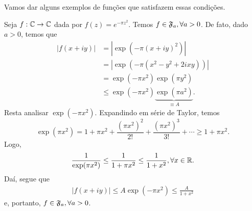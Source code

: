         Vamos dar alguns exemplos de funções que satisfazem essas condições.
        \begin{exemplo}
            Seja $f:\mathbb{C}\to\mathbb{C}$ dada por $f(z) = e^{-\pi z^2}$. Temos $f\in\mathfrak{F}_a, \forall a>0$.
            De fato, dado $a>0$, temos que
            \begin{align*}
                |f(x+iy)| &= |\exp(-\pi(x+iy)^2)| \\
                          &= |\exp(-\pi(x^2-y^2+2ixy))| \\
                          &= \exp(-\pi x^2)\exp(\pi y^2) \\
                          &\leq \exp(-\pi x^2)\underbrace{\exp(\pi a^2)}_{\equiv A}.
            \end{align*}
            Resta analisar $\exp(-\pi x^2)$. Expandindo em série de Taylor, temos
            \begin{equation*}
                \exp(\pi x^2) = 1 + \pi x^2 + \frac{(\pi x^2)^2}{2!} + \frac{(\pi x^2)^3}{3!} + \cdots
                              \geq 1 + \pi x^2.
            \end{equation*}
            Logo,
            \begin{equation*}
                \frac{1}{\exp(\pi x^2)}\leq\frac{1}{1+\pi x^2}\leq\frac{1}{1+x^2},\forall x\in\mathbb{R}.
            \end{equation*}
            Daí, segue que
            \begin{align*}
                |f(x+iy)| \leq A\exp(-\pi x^2) \leq \frac{A}{1+x^2}
            \end{align*}
            e, portanto, $f\in\mathfrak{F}_a, \forall a>0$.
        \end{exemplo}
